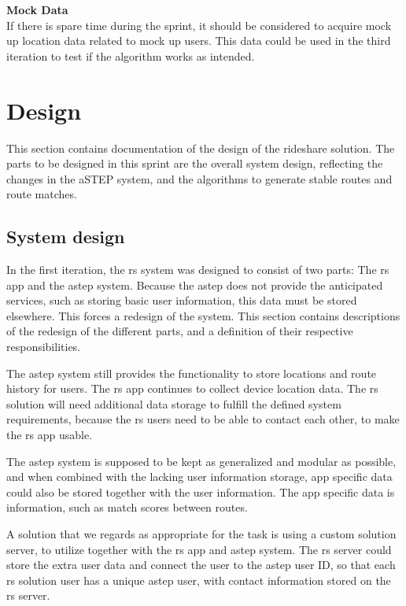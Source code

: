 \textbf{Mock Data}\\
If there is spare time during the sprint, it should be considered to acquire mock up location data related to mock up users. 
This data could be used in the third iteration to test if the algorithm works as intended.
\section{Design}

This section contains documentation of the design of the rideshare solution.
The parts to be designed in this sprint are the overall system design, reflecting the changes in the aSTEP system, and the algorithms to generate stable routes and route matches.

\subsection{System design}
In the first iteration, the \gls{rs} system was designed to consist of two parts: The \gls{rs} app and the \gls{astep} system.
Because the \gls{astep} does not provide the anticipated services, such as storing basic user information, this data must be stored elsewhere.
This forces a redesign of the system.
This section contains descriptions of the redesign of the different parts, and a definition of their respective responsibilities.


The \gls{astep} system still provides the functionality to store locations and route history for users.
The \gls{rs} app continues to collect  device location data.  
The \gls{rs} solution will need additional data storage to fulfill the defined system requirements, because the \gls{rs} users need to be able to contact each other, to make the \gls{rs} app usable.


The \gls{astep} system is supposed to be kept as generalized and modular as possible, and when combined with the lacking user information storage, app specific data could also be stored together with the user information.
The app specific data is information, such as match scores between routes.


A solution that we regards as appropriate for the task is using a custom solution server, to utilize together with the \gls{rs} app and \gls{astep} system.
The \gls{rs} server could store the extra user data and connect the user to the \gls{astep} user ID, so that each \gls{rs} solution user has a unique \gls{astep} user, with contact information stored on the \gls{rs} server.


